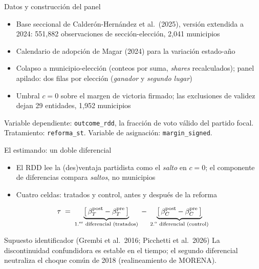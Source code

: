 \documentclass[
  aspectratio=43,        %
  t,                     %
  10pt                   %
]{beamer}
\begin{document}
\begin{frame}{Datos y construcción del panel}

  \begin{itemize}
    \item Base seccional de Calderón-Hernández et al.\ (2025), versión extendida
          a 2024: \textcolor{ITAMgreen}{551{,}882} observaciones de
          sección-elección, 2{,}041 municipios
    \item Calendario de adopción de Magar (2024) para la variación estado-año
    \item Colapso a municipio-elección (conteos por suma, \emph{shares}
          recalculados); panel apilado: dos filas por elección
          (\emph{ganador} y \emph{segundo lugar})
    \item Umbral $c = 0$ sobre el margen de victoria firmado; las exclusiones de
          validez dejan \textcolor{ITAMgreen}{29 entidades, 1{,}952 municipios}
  \end{itemize}

  \vspace{0.3em}
  {\footnotesize \textcolor{ITAMgray}{%
    Variable dependiente: \texttt{outcome\_rdd}, la fracción de voto válido del
    partido focal. Tratamiento: \texttt{reforma\_st}. Variable de asignación:
    \texttt{margin\_signed}.}}

\end{frame}

\begin{frame}{El estimando: un doble diferencial}

  \begin{itemize}
    \item El RDD lee la (des)ventaja partidista como el \emph{salto} en $c=0$;
          el componente de diferencias compara \emph{saltos}, no municipios
    \item Cuatro celdas: tratados y control, antes y después de la reforma
  \end{itemize}

  \vspace{0.4em}
  \[
    \tau \;=\;
    \underbrace{\big[\,\beta^{\text{post}}_{T}-\beta^{\text{pre}}_{T}\,\big]}_{\text{1.\textsuperscript{er} diferencial (tratados)}}
    \;-\;
    \underbrace{\big[\,\beta^{\text{post}}_{C}-\beta^{\text{pre}}_{C}\,\big]}_{\text{2.\textsuperscript{o} diferencial (control)}}
  \]

  \vspace{0.2em}
  \begin{block}{Supuesto identificador (Grembi et al.\ 2016; Picchetti et al.\ 2026)}
    \small La discontinuidad confundidora es estable en el tiempo; el segundo
    diferencial neutraliza el choque común de 2018 (realineamiento de MORENA).
  \end{block}

\end{frame}
\end{document}
